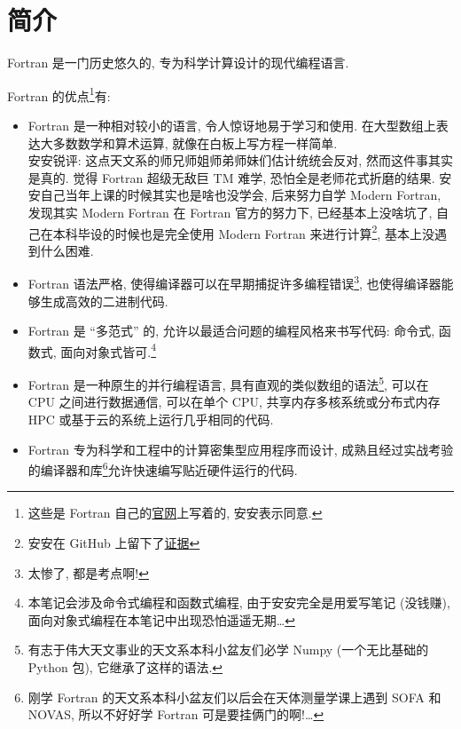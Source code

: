 \chapter{简介}\label{introduction}

Fortran 是一门历史悠久的, 专为科学计算设计的现代编程语言.

Fortran 的优点\footnote{这些是 Fortran 自己的\href{https://fortran-lang.org/}{官网}上写着的, 安安表示同意.}有:
\begin{itemize}
    \item Fortran 是一种相对较小的语言, 令人惊讶地易于学习和使用. 在大型数组上表达大多数数学和算术运算, 就像在白板上写方程一样简单.\\安安锐评: 这点天文系的师兄师姐师弟师妹们估计统统会反对, 然而这件事其实是真的. 觉得 Fortran 超级无敌巨 TM 难学, 恐怕全是老师花式折磨的结果. 安安自己当年上课的时候其实也是啥也没学会, 后来努力自学 Modern Fortran, 发现其实 Modern Fortran 在 Fortran 官方的努力下, 已经基本上没啥坑了, 自己在本科毕设的时候也是完全使用 Modern Fortran 来进行计算\footnote{安安在 GitHub 上留下了\href{https://github.com/GasinAn/echo1}{证据}}, 基本上没遇到什么困难.
    \item Fortran 语法严格, 使得编译器可以在早期捕捉许多编程错误\footnote{太惨了, 都是考点啊!}, 也使得编译器能够生成高效的二进制代码.
    \item Fortran 是 ``多范式'' 的, 允许以最适合问题的编程风格来书写代码: 命令式, 函数式, 面向对象式皆可.\footnote{本笔记会涉及命令式编程和函数式编程, 由于安安完全是用爱写笔记 (没钱赚), 面向对象式编程在本笔记中出现恐怕遥遥无期\dots{}}
    \item Fortran 是一种原生的并行编程语言, 具有直观的类似数组的语法\footnote{有志于伟大天文事业的天文系本科小盆友们必学 Numpy (一个无比基础的 Python 包), 它继承了这样的语法.}, 可以在 CPU 之间进行数据通信, 可以在单个 CPU, 共享内存多核系统或分布式内存 HPC 或基于云的系统上运行几乎相同的代码.
    \item Fortran 专为科学和工程中的计算密集型应用程序而设计, 成熟且经过实战考验的编译器和库\footnote{刚学 Fortran 的天文系本科小盆友们以后会在天体测量学课上遇到 SOFA 和 NOVAS, 所以不好好学 Fortran 可是要挂俩门的啊!\dots{}}允许快速编写贴近硬件运行的代码.
\end{itemize}

